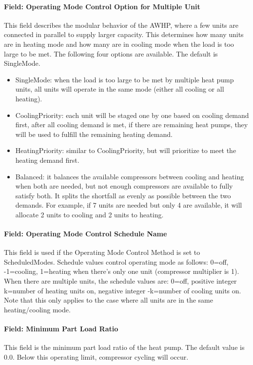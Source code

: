 \paragraph{Field: Operating Mode Control Option for Multiple Unit}
This field describes the modular behavior of the AWHP, where a few units are
connected in parallel to supply larger capacity. This determines how many units
are in heating mode and how many are in cooling mode when the load is too large
to be met. The following four options are available. The default is SingleMode.
\begin{itemize}
    \item SingleMode: when the load is too large to be met by multiple heat pump
units, all units will operate in the same mode (either all cooling or all
heating).
    \item CoolingPriority: each unit will be staged one by one based on cooling
demand first, after all cooling demand is met, if there are remaining heat
pumps, they will be used to fulfill the remaining heating demand.
\item HeatingPriority: similar to CoolingPriority, but will prioritize to meet
  the heating demand first.
\item Balanced: it balances the available compressors between cooling and heating
  when both are needed, but not enough compressors are available to fully
  satisfy both. It splits the shortfall as evenly as possible between the two
  demands. For example, if 7 units are needed but only 4 are available, it will
  allocate 2 units to cooling and 2 units to heating.
\end{itemize}
\paragraph{Field: Operating Mode Control Schedule Name} This field is used if
the Operating Mode Control Method is set to ScheduledModes. Schedule values
control operating mode as follows: 0=off, -1=cooling, 1=heating when there's
only one unit (compressor multiplier is 1). When there are multiple units, the
schedule values are: 0=off, positive integer k=number of heating units on,
negative integer -k=number of cooling units on. Note that this only applies to
the case where all units are in the same heating/cooling mode.
\paragraph{Field: Minimum Part Load Ratio} This field is the minimum part load
ratio of the heat pump. The default value is 0.0. Below this operating limit,
compressor cycling will occur.
